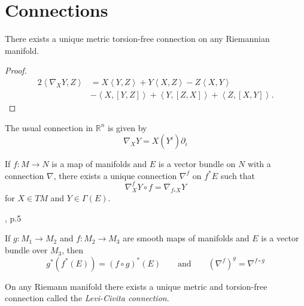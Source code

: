 \documentclass{book}
\begin{document}
\section{Connections}
\label{section-connections}

\begin{theorem}[Miracle]
\label{theorem-miracle}
There exists a unique metric torsion-free
connection on any Riemannian manifold.
\end{theorem}

\begin{proof}
$$
\begin{aligned}
2\left\langle{}\nabla_XY,Z\right\rangle{}
&=X\left\langle{}Y,Z\right\rangle{}+Y\left\langle{}X,Z\right\rangle{}-
Z\left\langle{}X,Y\right\rangle{}\\
&-\left\langle{}X,[Y,Z]\right\rangle{}+\left\langle{}Y,[Z,X]\right\rangle{}+
\left\langle{}Z,[X,Y]\right\rangle{}.
\end{aligned}
$$
\end{proof}

\begin{example}
\label{example-euclidean-connection}
The usual connection in $\mathbb{R}^n$ is
given by
$$
\nabla_XY=X(Y^i)\partial_i
$$
\end{example}

\begin{proposition}
\label{proposition-exist-pullb-conne}
If $f:M \to N$ is a map of manifolds
and $E$ is a vector bundle on $N$
with a connection $\nabla$,
there exists a unique connection $\nabla^f$
on $f^*E$ such that
$$
\nabla^f_XY\circ f=\nabla_{f_*X}Y
$$
for $X \in TM$ and $Y \in \Gamma(E)$.
\end{proposition}

\begin{lemma}
\label{lemma-compo-pullb-conne}
\begin{reference}
\cite{aulas}, p.5
\end{reference}
If $g:M_1\to M_2$ and $f:M_2\to M_3$ are
smooth maps of
manifolds and $E$ is a vector bundle over
$M_3$, then
$$
g^* (f^* (E))=(f\circ g)^* (E)\qquad
\text{and}\qquad
(\nabla^f)^g=\nabla^{f\circ g}
$$
\end{lemma}

\begin{proposition}
\label{proposition-existence-of-levi-civita}
On any Riemann manifold
there exists a unique metric and torsion-free
connection called the {\it Levi-Civita
connection}.
\end{proposition}
\end{document}
